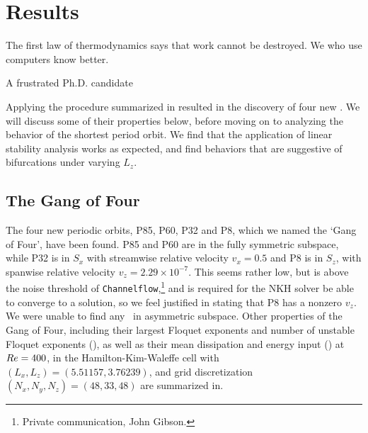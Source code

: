 \chapter{Results}
\epigraph{The first law of thermodynamics says that work cannot be destroyed. We who use computers know better.}{A frustrated Ph.D. candidate}

Applying the procedure summarized in  resulted in the discovery of four new \ecs. We will discuss some of their properties below, before moving on to analyzing the behavior of the shortest period orbit. We find that the application of linear stability analysis works as expected, and find behaviors that are suggestive of bifurcations under varying $L_z$.   
\section{The Gang of Four}

The four new periodic orbits, P85, P60, P32 and P8, which we named the `Gang of Four', have been found.  P85 and P60 are in the fully symmetric subspace, while P32 is in $S_x$ with streamwise relative velocity $v_x = 0.5$ and P8 is in $S_z$, with spanwise relative velocity $v_z = 2.29\times 10^{-7}$. This seems rather low, but is above the noise threshold of {\tt Channelflow},\footnote{Private communication, John Gibson.} and is required for the NKH solver be able to converge to a solution, so we feel justified in stating that P8 has a nonzero $v_z$. We were unable to find any \ecs\ in asymmetric subspace. Other properties of the Gang of Four, including their largest Floquet exponents and number of unstable Floquet exponents (), as well as their mean dissipation and energy input () at  $Re = 400$, in the Hamilton-Kim-Waleffe cell with $(L_x,L_z) = (5.51157, 3.76239)$, and grid discretization $(N_x,N_y,N_z)= (48,33,48)$  are summarized in. 

